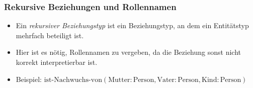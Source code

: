             \subsubsection{Rekursive Beziehungen und Rollennamen} %
                \begin{itemize}
                	\item Ein \textit{rekursiver Beziehungstyp} ist ein Beziehungstyp, an dem ein Entitätstyp mehrfach beteiligt ist.
                	\item Hier ist es nötig, Rollennamen zu vergeben, da die Beziehung sonst nicht korrekt interpretierbar ist.
                	\item Beispiel: \( \text{ist-Nachwuchs-von}(\text{Mutter}: \text{Person}, \text{Vater}: \text{Person}, \text{Kind}: \text{Person}) \)
                \end{itemize}
            	\begin{figure}[H]
            		\centering
            	\end{figure}

